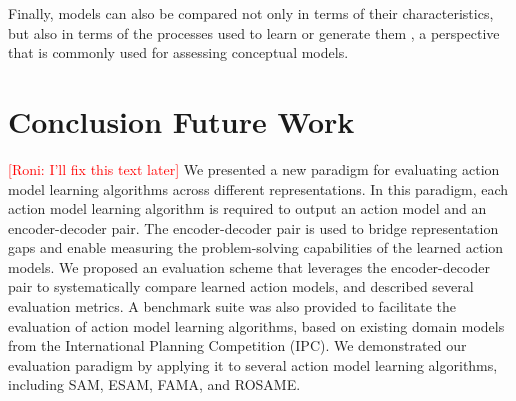 \documentclass{article}
\theoremstyle{definition}
\theoremstyle{remark}
\newcommand{\roni}[1]{{\textcolor{red}{[Roni: #1]}}}
\begin{document}
Finally, models can also be compared not only in terms of their characteristics, but also in terms of the processes used to learn or generate them \citep{vallati2021quality}, a perspective that is commonly used for assessing conceptual models.

\section{Conclusion Future Work}
\roni{I'll fix this text later}
We presented a new paradigm for evaluating action 
model learning algorithms across different representations. In this paradigm, each action model learning algorithm is required to output an action model and an encoder-decoder pair. The encoder-decoder pair is used to bridge representation gaps and enable measuring the problem-solving capabilities of the learned action models. We proposed an evaluation scheme that leverages the encoder-decoder pair to systematically compare learned action models, and described several evaluation metrics. A benchmark suite was also provided to facilitate the evaluation of action model learning algorithms, based on existing domain models from the International Planning Competition (IPC). We demonstrated our evaluation paradigm by applying it to several action model learning algorithms, including SAM, ESAM, FAMA, and ROSAME.




 
\end{document}
